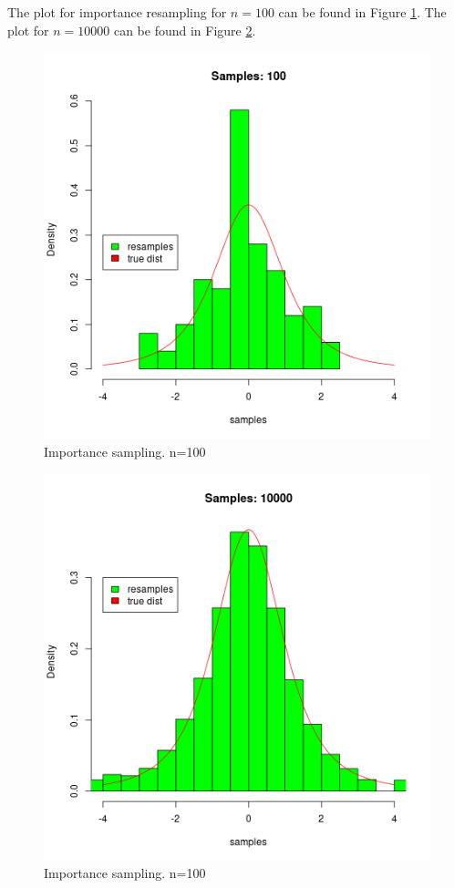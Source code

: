 \section{}

\subsection{}
The plot for importance resampling for $n=100$ can be found in Figure \ref{fig:resample_m100}.
The plot for $n=10000$ can be found in Figure \ref{fig:resample_m10000}.

\begin{figure}
     \centering
     \includegraphics[width=.50\textwidth]{../code/q1/plots/resample_m100.png}
     \caption{Importance sampling. n=100}
     \label{fig:resample_m100}
\end{figure}
\begin{figure}
     \centering
     \includegraphics[width=.50\textwidth]{../code/q1/plots/resample_m10000.png}
     \caption{Importance sampling. n=100}
     \label{fig:resample_m10000}
\end{figure}


\subsection{}

